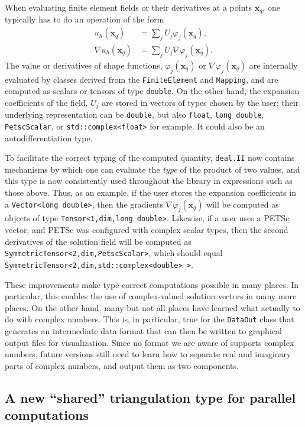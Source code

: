 \documentclass{ansarticle-preprint}
\newcommand{\specialword}[1]{\texttt{#1}}
\newcommand{\dealii}{{\specialword{deal.II}}}
\begin{document}
When evaluating finite element fields or their derivatives at
a points $\mathbf x_q$, one typically has to do an operation of the form
\begin{align*}
  u_h(\mathbf x_q) &= \sum_{j} U_j \varphi_j(\mathbf x_q),
  \\
  \nabla u_h(\mathbf x_q) &= \sum_{j} U_j \nabla\varphi_j(\mathbf x_q).
\end{align*}
The value or derivatives of shape functions, $\varphi_j(\mathbf x_q)$
or $\nabla\varphi_j(\mathbf x_q)$ are internally evaluated by classes
derived from the \texttt{FiniteElement} and \texttt{Mapping}, and are
computed as scalars or tensors of type \texttt{double}. On the other
hand, the expansion coefficients of the field, $U_j$ are stored in
vectors of types chosen by the user; their underlying representation
can be \texttt{double}, but also \texttt{float}, \texttt{long double},
\texttt{PetscScalar}, or \texttt{std::complex<float>} for example. It could also
be an autodifferentiation type.

To facilitate the correct typing of the computed quantity, \dealii{}
now contains mechanisms by which one can evaluate the \textit{type} of
the product of two values, and this type is now consistently used
throughout the library in expressions such as those above. Thus, as an
example, if the user stores the expansion coefficients in a
\texttt{Vector<long double>}, then the gradients
$\nabla\varphi_j(\mathbf x_q)$ will be computed as objects of type
\texttt{Tensor<1,dim,long double>}. Likewise, if a user uses a PETSc
vector, and PETSc was configured with complex scalar types, then the
second derivatives of the solution field will be computed as
\texttt{SymmetricTensor<2,dim,PetscScalar>}, which should equal
\texttt{SymmetricTensor<2,dim,std::complex<double> >}.

These improvements make type-correct computations possible in many
places. In particular, this enables the use of complex-valued solution
vectors in many more places. On the other hand, many but not all
places have learned what actually to do with complex numbers. This is,
in particular, true for the \texttt{DataOut} class that generates an
intermediate data format that can then be written to graphical output
files for visualization. Since no format we are aware of supports
complex numbers, future versions still need to learn how to separate
real and imaginary parts of complex numbers, and output them as two
components.


\subsection{A new ``shared'' triangulation type for parallel computations}
\end{document}
